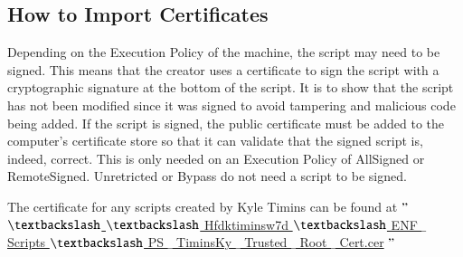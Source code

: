 \documentclass[a4paper,12pt]{report}
\begin{document}
\subsection*{How to Import Certificates}
 \par
Depending on the Execution Policy of the machine, the script may need to be signed. This means that the creator uses a certificate to sign the script with a cryptographic signature at the bottom of the script. It is to show that the script has not been modified since it was signed to avoid tampering and malicious code being added. If the script is signed, the public certificate must be added to the computer’s certificate store so that it can validate that the signed script is, indeed, correct. This is only needed on an Execution Policy of AllSigned or RemoteSigned. Unretricted or Bypass do not need a script to be signed. \par
The certificate for any scripts created by Kyle Timins can be found at  $ " $ \href{file:/// $  \textbackslash  $  $  \textbackslash  $ Hfdktiminsw7d $  \textbackslash  $ ENF $  \_  $ Scripts $  \textbackslash  $ PS $  \_  $ TiminsKy $  \_  $ Trusted $  \_  $ Root $  \_  $ Cert.cer}{ $  \textbackslash  $  $  \textbackslash  $ Hfdktiminsw7d $  \textbackslash  $ ENF $  \_  $ Scripts $  \textbackslash  $ PS $  \_  $ TiminsKy $  \_  $ Trusted $  \_  $ Root $  \_  $ Cert.cer}
 $ " $  \par
\end{document}
